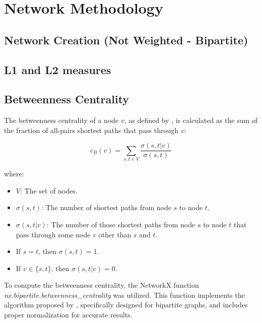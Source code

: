 \section{Network Methodology}

\subsection{Network Creation (Not Weighted - Bipartite)}


\subsection{L1 and L2 measures}


\subsection{Betweenness Centrality}
The betweenness centrality of a node \(v\), as defined by  \cite{Brandes_2008}, 
is calculated as the sum of the fraction of all-pairs shortest paths that pass through \(v\):

\begin{equation}
    c_B(v) = \sum_{s,t \in V} \frac{\sigma(s, t|v)}{\sigma(s, t)} \label{eq:betweenness}
\end{equation}

where:

\begin{itemize}
    \setlength\itemsep{0.4em} %
    \item \(V\): The set of nodes.
    \item \(\sigma(s, t)\): The number of shortest paths from node \(s\) to node \(t\).
    \item \(\sigma(s, t|v)\): The number of those shortest paths from node \(s\) to node \(t\) that pass 
    through some node \(v\) other than \(s\) and \(t\).
    \item If \(s = t\), then \(\sigma(s, t) = 1\).
    \item If \(v \in \{s, t\}\), then \(\sigma(s, t|v) = 0\).
\end{itemize}

To compute the betweenness centrality, the NetworkX function \textit{nx.bipartite.betweenness\_centrality} 
was utilized. This function implements the algorithm proposed by  \cite{Brandes_2004}, 
specifically designed for bipartite graphs, and includes proper normalization for accurate results.

